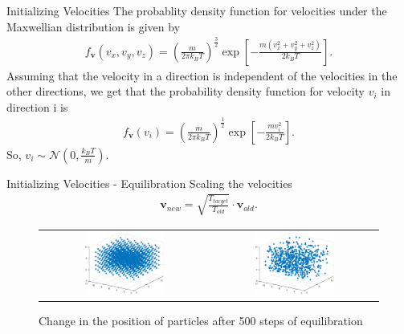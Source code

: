 \documentclass{beamer}
\renewcommand{\vec}[1]{\mathbf{#1}}
\begin{document}
\begin{frame}{Initializing Velocities}
The probablity density function for velocities under the Maxwellian distribution is given by
\begin{align*}
	f_{\vec{v}}\left(v_{x}, v_{y}, v_{z}\right) = \left(\frac{m}{2\pi k_{B} T}\right)^{\frac{3}{2}}\exp\left[-\frac{m\left(v_{x}^{2}+v_{y}^{2}+v_{z}^{2}\right)}{2k_{B}T}\right].
\end{align*} 
Assuming that the velocity in a direction is independent of the velocities in the other directions, we get that the probability density function for velocity $v_{i}$ in direction {i} is
\begin{align*}
	f_{\vec{v}}\left(v_{i}\right) = \left(\frac{m}{2\pi k_{B} T}\right)^{\frac{1}{2}}\exp\left[-\frac{mv_{i}^{2}}{2k_{B}T}\right].
\end{align*}
So, $v_{i} \sim \mathcal{N}\left(0,\frac{k_{B}T}{m}\right)$.
\end{frame}

\begin{frame}{Initializing Velocities - Equilibration}
 Scaling the velocities
\begin{align*}
	\vec{v}_{new} = \sqrt{\frac{T_{target}}{T_{old}}}\cdot\vec{v}_{old}.
\end{align*}
\begin{figure}
	\centering
 	\begin{tabular}{@{}cc@{}}
		\includegraphics[width=0.5\textwidth]{initial_solid_-57_27_2.eps} &
  		\includegraphics[width=0.5\textwidth]{equilibrated_solid_-57_27_2.eps} \\
 	\end{tabular}
  	\caption{Change in the position of particles after 500 steps of equilibration}
\end{figure}
\end{frame}
\end{document}
